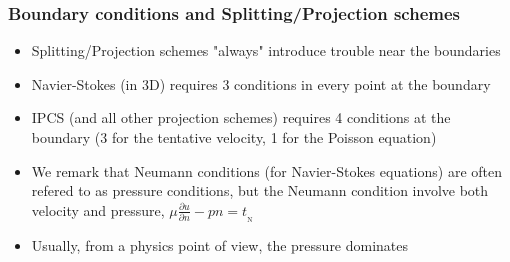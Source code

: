 \begin{frame}
\frametitle{Boundary conditions and Splitting/Projection schemes}
\begin{itemize}
\item Splitting/Projection schemes "always" introduce trouble near the boundaries 
\item Navier-Stokes (in 3D) requires 3 conditions in every point at the boundary
\item IPCS (and all other projection schemes) requires 4 conditions at the boundary (3 for the tentative velocity, 1 for the Poisson equation) 
\item We remark that Neumann conditions (for Navier-Stokes equations) are often refered to as pressure 
conditions, but the  Neumann condition involve both velocity and pressure, 
$\mu \frac{\partial u}{\partial n} - p n  = t_{_\mathrm{N}}$ 
\item Usually, from a physics point of view, the pressure dominates
\end{itemize}
\end{frame}
